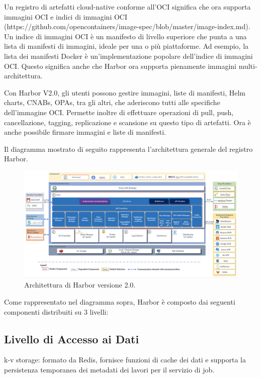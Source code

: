 \documentclass[12pt]{report}
\begin{document}
Un registro di artefatti cloud-native conforme all'OCI significa che ora supporta immagini OCI e indici di immagini OCI (https://github.com/opencontainers/image-spec/blob/master/image-index.md). Un indice di immagini OCI è un manifesto di livello superiore che punta a una lista di manifesti di immagini, ideale per una o più piattaforme. Ad esempio, la lista dei manifesti Docker è un'implementazione popolare dell'indice di immagini OCI. Questo significa anche che Harbor ora supporta pienamente immagini multi-architettura.

Con Harbor V2.0, gli utenti possono gestire immagini, liste di manifesti, Helm charts, CNABs, OPAs, tra gli altri, che aderiscono tutti alle specifiche dell'immagine OCI. Permette inoltre di effettuare operazioni di pull, push, cancellazione, tagging, replicazione e scansione su questo tipo di artefatti. Ora è anche possibile firmare immagini e liste di manifesti.

Il diagramma mostrato di seguito rappresenta l'architettura generale del registro Harbor.

\begin{figure}[h]
\centering
\includegraphics[width=\textwidth]{images/architecture.png}
\caption{Architettura di Harbor versione 2.0.}
\end{figure}

Come rappresentato nel diagramma sopra, Harbor è composto dai seguenti componenti distribuiti su 3 livelli:

\subsection{Livello di Accesso ai Dati}

k-v storage: formato da Redis, fornisce funzioni di cache dei dati e supporta la persistenza temporanea dei metadati dei lavori per il servizio di job.
\end{document}
